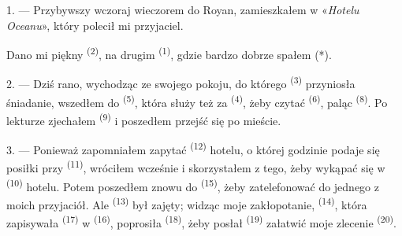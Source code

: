 %
%


\VUsaut{3.0mm}
\VUsaut{1.6mm}
\VUsaut{2.0mm}
\VUsaut{3.4mm}

1. --- Przybywszy wczoraj wieczorem do Royan, zamieszkałem w «\textit{Hotelu Oceanu}»,
który polecił mi przyjaciel.

Dano mi piękny  \textsuperscript{(2)}, na drugim 
\textsuperscript{(1)}, gdzie bardzo dobrze spałem (*).

2. --- Dziś rano, wychodząc ze swojego pokoju, do którego 
\textsuperscript{(3)} przyniosła śniadanie, wszedłem do 
\textsuperscript{(5)}, która służy też za  \textsuperscript{(4)}, żeby
czytać  \textsuperscript{(6)}, paląc 
\textsuperscript{(8)}. Po lekturze zjechałem  \textsuperscript{(9)} i
poszedłem przejść się po mieście.

3. --- Ponieważ zapomniałem zapytać  \textsuperscript{(12)} hotelu, o
której godzinie podaje się posiłki przy  \textsuperscript{(11)},
wróciłem wcześnie i skorzystałem z tego, żeby wykąpać się w 
\textsuperscript{(10)} hotelu. Potem poszedłem znowu do 
\textsuperscript{(15)}, żeby zatelefonować do jednego z moich przyjaciół. Ale
 \textsuperscript{(13)} był zajęty; widząc moje zakłopotanie,
 \textsuperscript{(14)}, która zapisywała 
\textsuperscript{(17)} w  \textsuperscript{(16)}, poprosiła
 \textsuperscript{(18)}, żeby posłał 
\textsuperscript{(19)} załatwić moje zlecenie 
\textsuperscript{(20)}.

